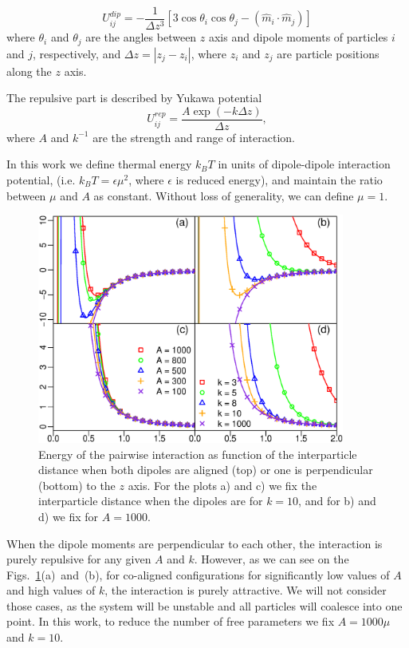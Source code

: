 \begin{equation}
\label{eq:dipole_dipole_1D}
U_{ij}^{dip} = - \frac{1}{\Delta z^3} [3 \cos \theta_i \cos \theta_j - (\hat{m}_i \cdot \hat{m}_j)]
\end{equation}
where $\theta_i$ and $\theta_j$ are the angles between $z$ axis and dipole moments of particles $i$ and $j$, respectively, and $\Delta z = |z_j - z_i|$, where $z_i$ and $z_j$ are particle positions along the $z$ axis.

The repulsive part is described by Yukawa potential
\begin{equation}
\label{eq:yukawa_interaction}
U_{ij}^{rep} = \frac{A \exp(-k \Delta z)}{\Delta z},
\end{equation}
where $A$ and $k^{-1}$ are the strength and range of interaction. 

In this work we define thermal energy $k_BT$ in units of dipole-dipole interaction potential, (i.e. $k_BT = \epsilon \mu^2$, where $\epsilon$ is reduced energy), and maintain the ratio between $\mu$ and $A$ as constant. Without loss of generality, we can define $\mu = 1$.

\begin{figure}[p]
\centering
	\includegraphics[width=0.9\textwidth]{Images/particle_interaction_potential}
\captionsetup{justification=centering, width=0.9\textwidth}
\caption{Energy of the pairwise interaction as function of the interparticle distance when both dipoles are aligned (top) or one is perpendicular (bottom) to the $z$ axis. For the plots a) and c) we fix the interparticle distance when the dipoles are for $k = 10$, and for b) and d) we fix for $A = 1000$.}
\label{fig:interaction_energy}
\end{figure}

When the dipole moments are perpendicular to each other, the interaction is purely repulsive for any given $A$ and $k$. However, as we can see on the Figs.~\ref{fig:interaction_energy}(a)~and~(b), for co-aligned configurations for significantly low values of $A$ and high values of $k$, the interaction is purely attractive. We will not consider those cases, as the system will be unstable and all particles will coalesce into one point. In this work, to reduce the number of free parameters we fix $A = 1000 \mu$ and $k = 10$.
